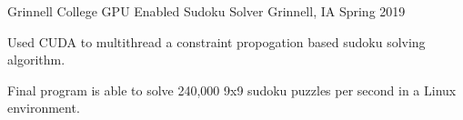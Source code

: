 \documentclass[12pt, a4paper]{awesome-cv}
\begin{document}
\begin{cventries}



  \cventry
    {Grinnell College}
    {GPU Enabled Sudoku Solver}
    {Grinnell, IA}
    {Spring 2019}
    {
	\begin{cvitems}
	  \item{Used CUDA to multithread a constraint propogation based sudoku solving algorithm.}
	  \item{Final program is able to solve 240,000 9x9 sudoku puzzles per second in a Linux environment.}
	\end{cvitems}
    }




\end{cventries}
\end{document}
